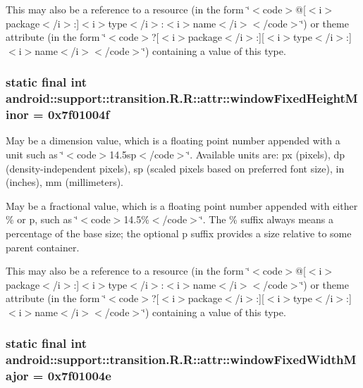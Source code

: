 This may also be a reference to a resource (in the form \char`\"{}$<$code$>$@\mbox{[}$<$i$>$package$<$/i$>$:\mbox{]}$<$i$>$type$<$/i$>$:$<$i$>$name$<$/i$>$$<$/code$>$\char`\"{}) or theme attribute (in the form \char`\"{}$<$code$>$?\mbox{[}$<$i$>$package$<$/i$>$:\mbox{]}\mbox{[}$<$i$>$type$<$/i$>$:\mbox{]}$<$i$>$name$<$/i$>$$<$/code$>$\char`\"{}) containing a value of this type. \hypertarget{classandroid_1_1support_1_1transition_1_1_r_1_1attr_54fde15c687ec7c25a5bd8cabbdd890e}{
\subsubsection[{windowFixedHeightMinor}]{\setlength{\rightskip}{0pt plus 5cm}static final int android::support::transition.R.R::attr::windowFixedHeightMinor = 0x7f01004f}}
\label{classandroid_1_1support_1_1transition_1_1_r_1_1attr_54fde15c687ec7c25a5bd8cabbdd890e}


May be a dimension value, which is a floating point number appended with a unit such as \char`\"{}$<$code$>$14.5sp$<$/code$>$\char`\"{}. Available units are: px (pixels), dp (density-independent pixels), sp (scaled pixels based on preferred font size), in (inches), mm (millimeters). 

May be a fractional value, which is a floating point number appended with either \% or p, such as \char`\"{}$<$code$>$14.5\%$<$/code$>$\char`\"{}. The \% suffix always means a percentage of the base size; the optional p suffix provides a size relative to some parent container. 

This may also be a reference to a resource (in the form \char`\"{}$<$code$>$@\mbox{[}$<$i$>$package$<$/i$>$:\mbox{]}$<$i$>$type$<$/i$>$:$<$i$>$name$<$/i$>$$<$/code$>$\char`\"{}) or theme attribute (in the form \char`\"{}$<$code$>$?\mbox{[}$<$i$>$package$<$/i$>$:\mbox{]}\mbox{[}$<$i$>$type$<$/i$>$:\mbox{]}$<$i$>$name$<$/i$>$$<$/code$>$\char`\"{}) containing a value of this type. \hypertarget{classandroid_1_1support_1_1transition_1_1_r_1_1attr_875826d362e89dffd26faa9d2decd3b5}{
\subsubsection[{windowFixedWidthMajor}]{\setlength{\rightskip}{0pt plus 5cm}static final int android::support::transition.R.R::attr::windowFixedWidthMajor = 0x7f01004e}}
\label{classandroid_1_1support_1_1transition_1_1_r_1_1attr_875826d362e89dffd26faa9d2decd3b5}


